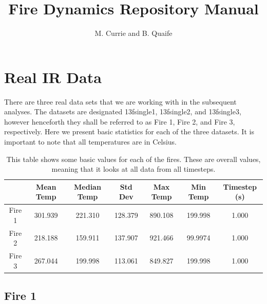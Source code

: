 \documentclass{article}
\begin{document}
\title{Fire Dynamics Repository Manual}
\author{M. Currie and B. Quaife}
\maketitle



\section{Real IR Data}
There are three real data sets that we are working with in the subsequent analyses. 
The datasets are designated 13fsingle1, 13fsingle2, and 13fsingle3, however 
henceforth they shall be referred to as Fire 1, Fire 2, and Fire 3, respectively. Here we 
present basic statistics for each of the three datasets. It is important to note that all 
temperatures are in Celsius.

\begin{table}

\begin{tabular}{|c|c|c|c|c|c|c|}
\hline
 & Mean Temp & Median Temp & Std Dev & Max Temp & Min Temp & Timestep (s) \\
\hline
Fire 1 & 301.939 & 221.310 & 128.379 & 890.108 & 199.998 & 1.000 \\
\hline
Fire 2 & 218.188 & 159.911 & 137.907 & 921.466 & 99.9974 & 1.000 \\
\hline
Fire 3 & 267.044 & 199.998 & 113.061 & 849.827 & 199.998 & 1.000 \\
\hline
\end{tabular}
\centering
\caption{This table shows some basic values for each of the fires. These are overall values, meaning that it looks at all data from all timesteps.}
\end{table}

\subsection{Fire 1}
\end{document}
